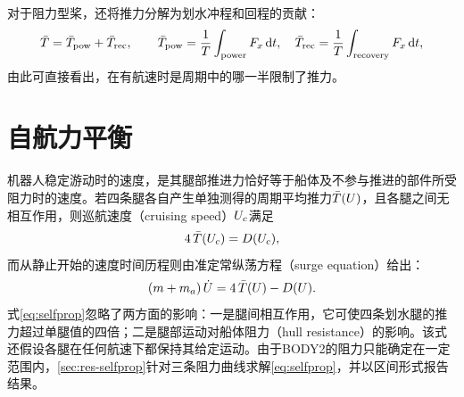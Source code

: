 对于阻力型桨，还将推力分解为划水冲程和回程的贡献：
\begin{equation}
  \bar{T} = \bar{T}_\text{pow} + \bar{T}_\text{rec}, \qquad
  \bar{T}_\text{pow} = \frac1T\int_{\text{power}} F_x\,\mathrm dt, \quad
  \bar{T}_\text{rec} = \frac1T\int_{\text{recovery}} F_x\,\mathrm dt,
  \label{eq:split}
\end{equation}
由此可直接看出，在有航速时是周期中的哪一半限制了推力。

\section{自航力平衡}
\label{sec:fund-selfprop}

机器人稳定游动时的速度，是其腿部推进力恰好等于船体及不参与推进的部件所受阻力时的速度。若四条腿各自产生单独测得的周期平均推力$\bar{T}(U)$，且各腿之间无相互作用，则巡航速度（cruising speed）$U_c$满足
\begin{equation}
  4\,\bar{T}(U_c) = D(U_c),
  \label{eq:selfprop}
\end{equation}
而从静止开始的速度时间历程则由准定常纵荡方程（surge equation）给出：
\begin{equation}
  (m+m_a)\,\dot{U} = 4\,\bar{T}(U) - D(U).
  \label{eq:surge}
\end{equation}
式\eqref{eq:selfprop}忽略了两方面的影响：一是腿间相互作用，它可使四条划水腿的推力超过单腿值的四倍\cite{Wang2025}；二是腿部运动对船体阻力（hull resistance）的影响。该式还假设各腿在任何航速下都保持其给定运动。由于BODY2的阻力只能确定在一定范围内，\cref{sec:res-selfprop}针对三条阻力曲线求解\eqref{eq:selfprop}，并以区间形式报告结果。
